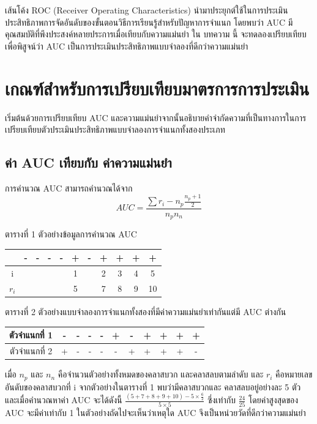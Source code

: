 \documentclass[twoside, twocolumn, 12pt]{article}
\begin{document}
เส้นโค้ง ROC (Receiver Operating Characteristics) นำมาประยุกต์ใช้ในการประเมินประสิทธิภาพการจัดอันดับของขั้นตอนวิธีการเรียนรู้สำหรับปัญหาการจำแนก \cite{2,3} โดยพบว่า AUC มีคุณสมบัติที่พึงประสงค์หลายประการเมื่อเทียบกับความแม่นยำ 
ใน บทความ นี้ จะทดลองเปรียบเทียบเพื่อพิสูจน์ว่า AUC เป็นการประเมินประสิทธิภาพแบบจำลองที่ดีกว่าความแม่นยำ

\section{เกณฑ์สำหรับการเปรียบเทียบมาตรการการประเมิน}
\quad เริ่มต้นด้วยการเปรียบเทียบ AUC และความแม่นยำจากนั้นอธิบายคำจำกัดความที่เป็นทางการในการเปรียบเทียบตัวประเมินประสิทธิภาพแบบจำลองการจำแนกทั้งสองประเภท
\subsection{ค่า AUC เทียบกับ ค่าความแม่นยำ}
\quad การคำนวณ AUC สามารถคำนวณได้จาก\cite{1}
\begin{equation}
AUC = \frac{\sum r_i-n_p\frac{n_p + 1}{2}}{n_pn_n}
\end{equation}
\begin{center} ตารางที่ 1 ตัวอย่างข้อมูลการคำนวณ AUC \end{center}
\begin{center}
\begin{tabular}{ccccccccccc}
  &-&-&-&-&+&-&+&+&+&+ \\
  \hline
  i&&&&&1&&2&3&4&5 \\
  $r_i$& & & & & 5&&7&8&9&10\\
  \hline  
\end{tabular}
\end{center}
ตารางที่ 2 ตัวอย่างแบบจำลองการจำแนกทั้งสองที่มีค่าความแม่นยำเท่ากันแต่มี AUC ต่างกัน
\begin{center}
\begin{tabular}{c|ccccc|ccccc}
  \hline
  ตัวจำแนกที่ 1 &-& -& -& -& +& -& +& +& +& +\\
  \hline
  ตัวจำแนกที่ 2 & +& -& -& -& -& +& +& +& +& -\\
  \hline  
\end{tabular}
\end{center}

เมื่อ $n_p$ และ $n_n$ คือจำนวนตัวอย่างทั้งหมดของคลาสบวก และคลาสลบตามลำดับ และ $r_i$ คือหมายเลขอันดับของคลาสบวกที่ i จากตัวอย่างในตารางที่ 1 พบว่ามีคลาสบวกและ คลาสลบอยู่อย่างละ 5 ตัว และเมื่อคำนวณหาค่า AUC จะได้ดังนี้ $\frac{(5+7+8+9+10)- 5\times\frac{6}{2}}{5\times5}$ ซึ่งเท่ากับ $\frac{24}{25}$ โดยค่าสูงสุดของ AUC จะมีค่าเท่ากับ 1 ในตัวอย่างถัดไปจะเห็นว่าเหตุใด AUC จึงเป็นหน่วยวัดที่ดีกว่าความแม่นยำ
\end{document}
